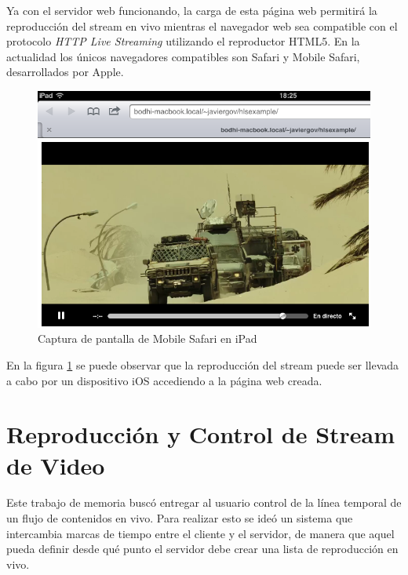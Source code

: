 Ya con el servidor web funcionando, la carga de esta página web permitirá la reproducción del stream en vivo mientras el navegador web sea compatible con el protocolo \textit{HTTP Live Streaming} utilizando el reproductor HTML5. En la actualidad los únicos navegadores compatibles son Safari y Mobile Safari, desarrollados por Apple.\\
\begin{figure}[H]
	\centering
	\includegraphics[scale=0.6]{imgs/ipad-hlsexample.png}
	\caption{Captura de pantalla de Mobile Safari en iPad}
	\label{ipad-hlsexample}	
\end{figure}

En la figura \ref{ipad-hlsexample} se puede observar que la reproducción del stream puede ser llevada a cabo por un dispositivo iOS accediendo a la página web creada.\\








	
	
\section{Reproducción y Control de Stream de Video}

	Este trabajo de memoria buscó entregar al usuario control de la línea temporal de un flujo de contenidos en vivo. Para realizar esto se ideó un sistema que intercambia marcas de tiempo entre el cliente y el servidor, de manera que aquel pueda definir desde qué punto el servidor debe crear una lista de reproducción en vivo. \\
	
